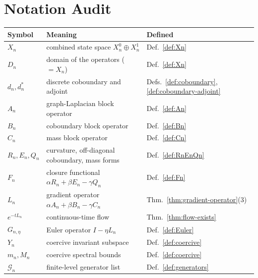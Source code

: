 \documentclass[11pt, a4paper]{amsart}
\theoremstyle{definition}
\begin{document}
\section{Notation Audit}
\label{app:notation}

\begin{center}
\begin{tabular}{lll}
\hline
Symbol & Meaning & Defined \\
\hline
$X_n$ & combined state space $X_n^0 \oplus X_n^1$ & Def.~\ref{def:Xn} \\
$D_n$ & domain of the operators ($= X_n$) & Def.~\ref{def:Xn} \\
$d_n, d_n^*$ & discrete coboundary and adjoint & Defs.~\ref{def:coboundary}, \ref{def:coboundary-adjoint} \\
$A_n$ & graph-Laplacian block operator & Def.~\ref{def:An} \\
$B_n$ & coboundary block operator & Def.~\ref{def:Bn} \\
$C_n$ & mass block operator & Def.~\ref{def:Cn} \\
$R_n, E_n, Q_n$ & curvature, off-diagonal coboundary, mass forms & Def.~\ref{def:RnEnQn} \\
$F_n$ & closure functional $\alpha R_n + \beta E_n - \gamma Q_n$ & Def.~\ref{def:Fn} \\
$L_n$ & gradient operator $\alpha A_n + \beta B_n - \gamma C_n$ & Thm.~\ref{thm:gradient-operator}(3) \\
$e^{-t L_n}$ & continuous-time flow & Thm.~\ref{thm:flow-exists} \\
$G_{n, \eta}$ & Euler operator $I - \eta L_n$ & Def.~\ref{def:Euler} \\
$Y_n$ & coercive invariant subspace & Def.~\ref{def:coercive} \\
$m_n, M_n$ & coercive spectral bounds & Def.~\ref{def:coercive} \\
$\mathcal{G}_n$ & finite-level generator list & Def.~\ref{def:generators} \\
\hline
\end{tabular}
\end{center}
\end{document}
